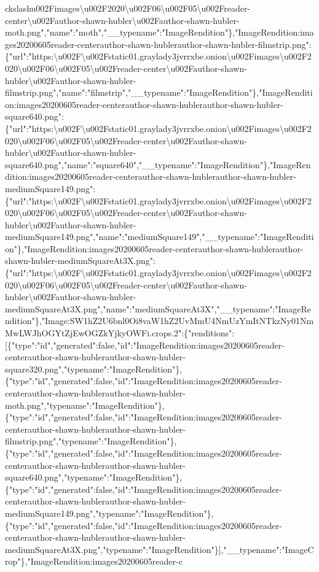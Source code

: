 ckslash{}u002Fimages\textbackslash{}u002F2020\textbackslash{}u002F06\textbackslash{}u002F05\textbackslash{}u002Freader-center\textbackslash{}u002Fauthor-shawn-hubler\textbackslash{}u002Fauthor-shawn-hubler-moth.png","name":"moth","\_\_typename":"ImageRendition"\},"ImageRendition:images20200605reader-centerauthor-shawn-hublerauthor-shawn-hubler-filmstrip.png":\{"url":"https:\textbackslash{}u002F\textbackslash{}u002Fstatic01.graylady3jvrrxbe.onion\textbackslash{}u002Fimages\textbackslash{}u002F2020\textbackslash{}u002F06\textbackslash{}u002F05\textbackslash{}u002Freader-center\textbackslash{}u002Fauthor-shawn-hubler\textbackslash{}u002Fauthor-shawn-hubler-filmstrip.png","name":"filmstrip","\_\_typename":"ImageRendition"\},"ImageRendition:images20200605reader-centerauthor-shawn-hublerauthor-shawn-hubler-square640.png":\{"url":"https:\textbackslash{}u002F\textbackslash{}u002Fstatic01.graylady3jvrrxbe.onion\textbackslash{}u002Fimages\textbackslash{}u002F2020\textbackslash{}u002F06\textbackslash{}u002F05\textbackslash{}u002Freader-center\textbackslash{}u002Fauthor-shawn-hubler\textbackslash{}u002Fauthor-shawn-hubler-square640.png","name":"square640","\_\_typename":"ImageRendition"\},"ImageRendition:images20200605reader-centerauthor-shawn-hublerauthor-shawn-hubler-mediumSquare149.png":\{"url":"https:\textbackslash{}u002F\textbackslash{}u002Fstatic01.graylady3jvrrxbe.onion\textbackslash{}u002Fimages\textbackslash{}u002F2020\textbackslash{}u002F06\textbackslash{}u002F05\textbackslash{}u002Freader-center\textbackslash{}u002Fauthor-shawn-hubler\textbackslash{}u002Fauthor-shawn-hubler-mediumSquare149.png","name":"mediumSquare149","\_\_typename":"ImageRendition"\},"ImageRendition:images20200605reader-centerauthor-shawn-hublerauthor-shawn-hubler-mediumSquareAt3X.png":\{"url":"https:\textbackslash{}u002F\textbackslash{}u002Fstatic01.graylady3jvrrxbe.onion\textbackslash{}u002Fimages\textbackslash{}u002F2020\textbackslash{}u002F06\textbackslash{}u002F05\textbackslash{}u002Freader-center\textbackslash{}u002Fauthor-shawn-hubler\textbackslash{}u002Fauthor-shawn-hubler-mediumSquareAt3X.png","name":"mediumSquareAt3X","\_\_typename":"ImageRendition"\},"Image:SW1hZ2U6bnl0Oi8vaW1hZ2UvMmU4NmUzYmItNTkzNy01NmMwLWJhOGYtZjEwOGZkYjkyOWFi.crops.2":\{"renditions":{[}\{"type":"id","generated":false,"id":"ImageRendition:images20200605reader-centerauthor-shawn-hublerauthor-shawn-hubler-square320.png","typename":"ImageRendition"\},\{"type":"id","generated":false,"id":"ImageRendition:images20200605reader-centerauthor-shawn-hublerauthor-shawn-hubler-moth.png","typename":"ImageRendition"\},\{"type":"id","generated":false,"id":"ImageRendition:images20200605reader-centerauthor-shawn-hublerauthor-shawn-hubler-filmstrip.png","typename":"ImageRendition"\},\{"type":"id","generated":false,"id":"ImageRendition:images20200605reader-centerauthor-shawn-hublerauthor-shawn-hubler-square640.png","typename":"ImageRendition"\},\{"type":"id","generated":false,"id":"ImageRendition:images20200605reader-centerauthor-shawn-hublerauthor-shawn-hubler-mediumSquare149.png","typename":"ImageRendition"\},\{"type":"id","generated":false,"id":"ImageRendition:images20200605reader-centerauthor-shawn-hublerauthor-shawn-hubler-mediumSquareAt3X.png","typename":"ImageRendition"\}{]},"\_\_typename":"ImageCrop"\},"ImageRendition:images20200605reader-c